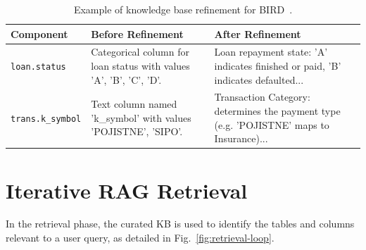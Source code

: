 \begin{table}[ht]
\centering
\footnotesize
\begin{tabular}{lp{4.5cm}p{6cm}}
\toprule
\textbf{Component} & \textbf{Before Refinement} & \textbf{After Refinement} \\
\midrule
\texttt{loan.status}    &  Categorical column for loan status with values 'A', 'B', 'C', 'D'.  & Loan repayment state: 'A' indicates finished or paid, 'B' indicates defaulted...  \\
\texttt{trans.k\_symbol} & Text column named 'k\_symbol' with values 'POJISTNE', 'SIPO'. & Transaction Category: determines the payment type (e.g. 'POJISTNE' maps to Insurance)... \\
\bottomrule
\end{tabular}
\caption{Example of knowledge base refinement for BIRD~\cite{li2023bird}.}
\label{tab:kb-refinement}
\end{table}

\section{Iterative RAG Retrieval}
In the retrieval phase, the curated KB is used to identify the tables and columns relevant to a user query, as detailed in Fig.~\ref{fig:retrieval-loop}.

